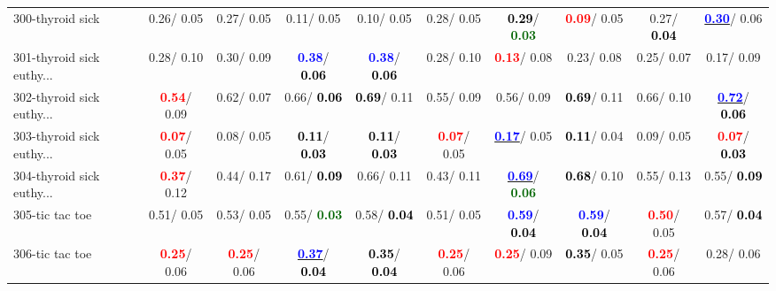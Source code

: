 \begin{table}[h]
\begin{center}
{\begin{tabular}{lc|c|c|c|c|c|c|c|c}
300-thyroid sick &   0.26/  0.05 &   0.27/  0.05 &   0.11/  0.05 &   0.10/  0.05 &   0.28/  0.05 & \textcolor{black}{\textbf{  0.29}}/\textcolor{darkgreen}{\textbf{  0.03}} & \textcolor{red}{\textbf{  0.09}}/  0.05 &   0.27/\textcolor{black}{\textbf{  0.04}} & \underline{\textcolor{blue}{\textbf{  0.30}}}/  0.06 \\
301-thyroid sick euthy... &   0.28/  0.10 &   0.30/  0.09 & \textcolor{blue}{\textbf{  0.38}}/\textcolor{black}{\textbf{  0.06}} & \textcolor{blue}{\textbf{  0.38}}/\textcolor{black}{\textbf{  0.06}} &   0.28/  0.10 & \textcolor{red}{\textbf{  0.13}}/  0.08 &   0.23/  0.08 &   0.25/  0.07 &   0.17/  0.09 \\
302-thyroid sick euthy... & \textcolor{red}{\textbf{  0.54}}/  0.09 &   0.62/  0.07 &   0.66/\textcolor{black}{\textbf{  0.06}} & \textcolor{black}{\textbf{  0.69}}/  0.11 &   0.55/  0.09 &   0.56/  0.09 & \textcolor{black}{\textbf{  0.69}}/  0.11 &   0.66/  0.10 & \underline{\textcolor{blue}{\textbf{  0.72}}}/\textcolor{black}{\textbf{  0.06}} \\ \hline
303-thyroid sick euthy... & \textcolor{red}{\textbf{  0.07}}/  0.05 &   0.08/  0.05 & \textcolor{black}{\textbf{  0.11}}/\textcolor{black}{\textbf{  0.03}} & \textcolor{black}{\textbf{  0.11}}/\textcolor{black}{\textbf{  0.03}} & \textcolor{red}{\textbf{  0.07}}/  0.05 & \underline{\textcolor{blue}{\textbf{  0.17}}}/  0.05 & \textcolor{black}{\textbf{  0.11}}/  0.04 &   0.09/  0.05 & \textcolor{red}{\textbf{  0.07}}/\textcolor{black}{\textbf{  0.03}} \\
304-thyroid sick euthy... & \textcolor{red}{\textbf{  0.37}}/  0.12 &   0.44/  0.17 &   0.61/\textcolor{black}{\textbf{  0.09}} &   0.66/  0.11 &   0.43/  0.11 & \underline{\textcolor{blue}{\textbf{  0.69}}}/\textcolor{darkgreen}{\textbf{  0.06}} & \textcolor{black}{\textbf{  0.68}}/  0.10 &   0.55/  0.13 &   0.55/\textcolor{black}{\textbf{  0.09}} \\
305-tic tac toe &   0.51/  0.05 &   0.53/  0.05 &   0.55/\textcolor{darkgreen}{\textbf{  0.03}} &   0.58/\textcolor{black}{\textbf{  0.04}} &   0.51/  0.05 & \textcolor{blue}{\textbf{  0.59}}/\textcolor{black}{\textbf{  0.04}} & \textcolor{blue}{\textbf{  0.59}}/\textcolor{black}{\textbf{  0.04}} & \textcolor{red}{\textbf{  0.50}}/  0.05 &   0.57/\textcolor{black}{\textbf{  0.04}} \\
306-tic tac toe & \textcolor{red}{\textbf{  0.25}}/  0.06 & \textcolor{red}{\textbf{  0.25}}/  0.06 & \underline{\textcolor{blue}{\textbf{  0.37}}}/\textcolor{black}{\textbf{  0.04}} & \textcolor{black}{\textbf{  0.35}}/\textcolor{black}{\textbf{  0.04}} & \textcolor{red}{\textbf{  0.25}}/  0.06 & \textcolor{red}{\textbf{  0.25}}/  0.09 & \textcolor{black}{\textbf{  0.35}}/  0.05 & \textcolor{red}{\textbf{  0.25}}/  0.06 &   0.28/  0.06 \\

\end{tabular}}
\end{center}
\end{table}
